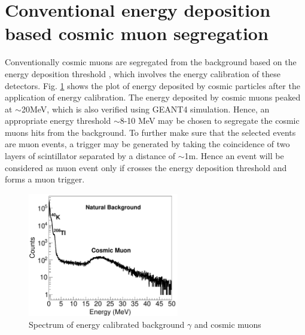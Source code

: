 \documentclass[twocolumn,amsmath,amssymb]{snp}
\begin{document}
\section*{Conventional energy deposition based cosmic muon segregation}
Conventionally cosmic muons are segregated from the background based on the energy deposition threshold \cite{mypaper}, which involves the energy calibration of these detectors. Fig. \ref{calib} shows the plot of energy deposited by cosmic particles after the application of energy calibration. The energy deposited by cosmic muons peaked at $\sim$20MeV, which is also verified using GEANT4 \cite{geant} simulation. Hence, an appropriate energy threshold $\sim$8-10 MeV may be chosen to segregate the cosmic muons hits from the background. To further make sure that the selected events are muon events, a trigger may be generated by taking the coincidence of two layers of scintillator separated by a distance of $\sim$1m. Hence an event will be considered as muon event only if crosses the energy deposition threshold and forms a muon trigger.
\begin{figure}
\includegraphics[width=66mm]{calibrated.pdf}%
\caption{\label{calib} Spectrum of energy calibrated background $\gamma$ and cosmic muons}
\end{figure}
\end{document}
